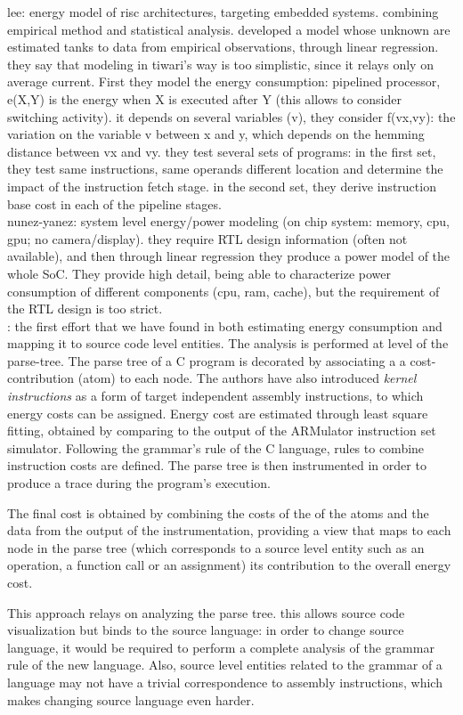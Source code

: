 lee: energy model of risc architectures, targeting embedded systems. combining empirical method and statistical analysis.
developed a model whose unknown are estimated tanks to data from empirical observations, through linear regression. they say that modeling in tiwari's way is too simplistic, since it relays only on average current.  
First they model the energy consumption: pipelined processor, e(X,Y) is the energy when X is executed after Y (this allows to consider switching activity). it depends on several variables (v), they consider f(vx,vy): the variation on the variable v between x and y, which depends on the hemming distance between vx and vy. 
they test several sets of programs: in the first set, they test same instructions, same operands different location and determine the impact of the instruction fetch stage. in the second set, they derive instruction base cost in each of the pipeline stages. \\[1in]


nunez-yanez: system level energy/power modeling (on chip system: memory, cpu, gpu; no camera/display). they require RTL design information (often not available), and then through linear regression they produce a power model of the whole SoC. They provide high detail, being able to characterize power consumption of different components (cpu, ram, cache), but the requirement of the RTL design is too strict. \\[1in]


\cite{brando2008}: the first effort that we have found in both estimating energy consumption and mapping it to source code level entities. The analysis is performed at level of the parse-tree. The parse tree of a C program is decorated by associating a a cost-contribution (atom) to each node. The authors have also introduced \emph{kernel instructions} as a form of target independent assembly instructions, to which energy costs can be assigned. Energy cost are estimated through least square fitting, obtained by comparing to the output of the ARMulator instruction set simulator. Following the grammar's rule of the C language, rules to combine instruction costs are defined. The parse tree is then instrumented in order to produce a trace during the program's execution. \par 
The final cost is obtained by combining the costs of the of the atoms and the data from the output of the instrumentation, providing a view that maps to each node in the parse tree (which corresponds to a source level entity such as an operation, a function call or an assignment) its contribution to the overall energy cost. \par 
This approach relays on analyzing the parse tree. this allows source code visualization but binds to the source language: in order to change source language, it would be required to perform a complete analysis of the grammar rule of the new language. Also, source level entities related to the grammar of a language may not have a trivial correspondence to assembly instructions, which makes changing source language even harder. \\[1in]


